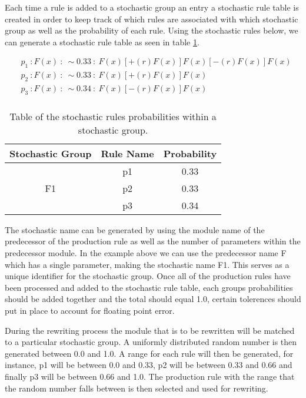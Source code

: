 Each time a rule is added to a stochastic group an entry a stochastic rule table is created in order to keep track of which rules are associated with which stochastic group as well as the probability of each rule. Using the stochastic rules below, we can generate a stochastic rule table as seen in table \ref{stochastic table}. 

\begin{equation} \label{stochastic implementation example}
\begin{aligned}
	&p_1~ :  F(x)~ :~ \sim 0.33 ~ :~ F(x)[+(r)F(x)]F(x)[-(r)F(x)]F(x)\\
	&p_2~ :  F(x)~ :~ \sim 0.33 ~ :~ F(x)[+(r)F(x)]F(x)\\
	&p_3~ :  F(x)~ :~ \sim 0.34 ~ :~ F(x)[-(r)F(x)]F(x)\\
\end{aligned}
\end{equation}

\begin{table}[h!] \center
\begin{tabular}{ | c | c | c | }
\hline
	Stochastic Group & Rule Name & Probability\\  
\hline
\hline
\multirow{3}{*}{F1} & p1 & 0.33 \\
& p2 & 0.33 \\
& p3 & 0.34 \\
\hline
\end{tabular}
\caption{Table of the stochastic rules probabilities within a stochastic group.}
\label{stochastic table}
\end{table}
\FloatBarrier

The stochastic name can be generated by using the module name of the predecessor of the production rule as well as the number of parameters within the predecessor module. In the example above we can use the predecessor name F which has a single parameter, making the stochastic name F1. This serves as a unique identifier for the stochastic group. Once all of the production rules have been processed and added to the stochastic rule table, each groups probabilities should be added together and the total should equal 1.0, certain tolerences should put in place to account for floating point error. 

During the rewriting process the module that is to be rewritten will be matched to a particular stochastic group. A uniformly distributed random number is then generated between 0.0 and 1.0. A range for each rule will then be generated, for instance, p1 will be between 0.0 and 0.33, p2 will be between 0.33 and 0.66 and finally p3 will be between 0.66 and 1.0. The production rule with the range that the random number falls between is then selected and used for rewriting. 

